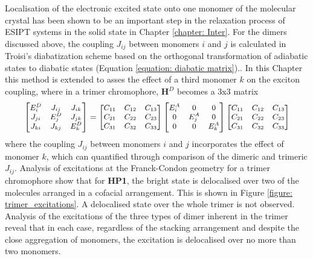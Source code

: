 Localisation of the electronic excited state onto one monomer of the molecular crystal has been shown to be an important step in the relaxation process of ESIPT systems in the solid state in Chapter \ref{chapter: Inter}. For the dimers discussed above, the coupling $J_{ij}$ between monomers $i$ and $j$ is calculated in Troisi's diabatization scheme based on the orthogonal transformation of adiabatic states to diabatic states (Equation \ref{equation: diabatic matrix}).\cite{Arago2015,Fornari2016}. In this Chapter this method is extended to asses the effect of a third monomer $k$ on the exciton coupling, where in a trimer chromophore, $\textbf{H}^D$ becomes a 3x3 matrix
\begin{equation}
\small
\label{equation: 3x3 diabatic matrix}
\begin{bmatrix}
E_{i}^D & J_{ij} & J_{ik}\\
J_{ji} & E_{j}^D & J_{jk} \\
J_{ki} & J_{kj}& E_{k}^D
\end{bmatrix}
=
\begin{bmatrix}
C_{11} & C_{12} & C_{13}\\
C_{21} & C_{22} & C_{23}\\
C_{31} & C_{32} & C_{33}
\end{bmatrix}
\begin{bmatrix}
E_{i}^A & 0 & 0\\
0 & E_{j}^A & 0\\
0 & 0 & E_{k}^A\\
\end{bmatrix}
\begin{bmatrix}
C_{11} & C_{12} & C_{13}\\
C_{21} & C_{22} & C_{23}\\
C_{31} & C_{32} & C_{33}
\end{bmatrix}
\end{equation} 
where the coupling $J_{ij}$ between monomers $i$ and $j$ incorporates the effect of monomer $k$, which can quantified through comparison of the dimeric and trimeric $J_{ij}$. Analysis of excitations at the Franck-Condon geometry for a trimer chromophore show that for \textbf{HP1}, the bright state is delocalised over two of the molecules arranged in a cofacial arrangement. This is shown in Figure \ref{figure: trimer_excitations}. A delocalised state over the whole trimer is not observed. Analysis of the excitations of the three types of dimer inherent in the trimer reveal that in each case, regardless of the stacking arrangement and despite the close aggregation of monomers, the excitation is delocalised over no more than two monomers. 

